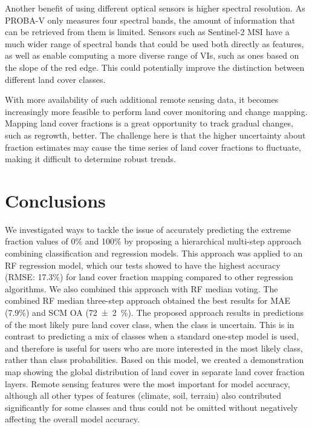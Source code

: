 \documentclass[review,authoryear,3p]{elsarticle}
\begin{document}
Another benefit of using different optical sensors is higher spectral resolution.
As PROBA-V only measures four spectral bands, the amount of information that can be retrieved from them is limited.
Sensors such as Sentinel-2 \gls{MSI} have a much wider range of spectral bands that could be used both directly as features, as well as enable computing a more diverse range of \glspl{VI}, such as ones based on the slope of the red edge.
This could potentially improve the distinction between different land cover classes.

With more availability of such additional remote sensing data, it becomes increasingly more feasible to perform land cover monitoring and change mapping.
Mapping land cover fractions is a great opportunity to track gradual changes, such as regrowth, better.
The challenge here is that the higher uncertainty about fraction estimates may cause the time series of land cover fractions to fluctuate, making it difficult to determine robust trends.

\section{Conclusions}

We investigated ways to tackle the issue of accurately predicting the extreme fraction values of 0\% and 100\% by proposing a hierarchical multi-step approach combining classification and regression models.
This approach was applied to an \gls{RF} regression model, which our tests showed to have the highest accuracy (RMSE: 17.3\%) for land cover fraction mapping compared to other regression algorithms.
We also combined this approach with \gls{RF} median voting.
The combined \gls{RF} median three-step approach obtained the best results for \gls{MAE} (7.9\%) and \gls{SCM} \gls{OA} (\SI{72\pm2}{\percent}).
The proposed approach results in predictions of the most likely pure land cover class, when the class is uncertain.
This is in contrast to predicting a mix of classes when a standard one-step model is used, and therefore is useful for users who are more interested in the most likely class, rather than class probabilities.
Based on this model, we created a demonstration map showing the global distribution of land cover in separate land cover fraction layers.
Remote sensing features were the most important for model accuracy, although all other types of features (climate, soil, terrain) also contributed significantly for some classes and thus could not be omitted without negatively affecting the overall model accuracy.
\end{document}
